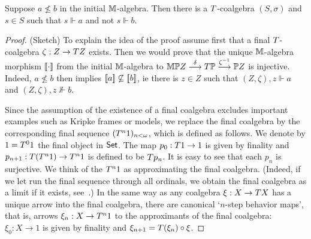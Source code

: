 \documentclass{book}
\begin{document}
\begin{proposition}\label{prop:coalg-compl}
  Suppose $a\not\le b$ in the initial $\mathbb{M}$-algebra. Then there is
  a $T$-coalgebra $(S,\sigma)$ and $s\in S$ such that $s\Vdash a$
  and not $s\Vdash b$. 
\end{proposition}
\xxviproofspace
\begin{proof} (Sketch) \hspace{0.1cm} To explain the idea of the proof
  assume first that a final $T$-coalgebra $\zeta:Z\to T Z$ exists.
  Then we would prove that the unique $\mathbb{M}$-algebra morphism
  $\mathopen{[\![} \cdot \mathclose{]\!]}$ from the initial $\mathbb{M}$-algebra to $\mathbb{M}\mathbb{P} Z
  \stackrel{\delta}{\longrightarrow}
  T\mathbb{P}\stackrel{\zeta^{-1}}{\longrightarrow}\mathbb{P} Z$ is injective.
  Indeed, $a\not\le b$ then implies $\mathopen{[\![} a \mathclose{]\!]}\not\subseteq\mathopen{[\![} b \mathclose{]\!]}$, ie
  there is $z\in Z$ such that $(Z,\zeta),z\Vdash a$ and
  $(Z,\zeta),z\not\Vdash b$.

  Since the assumption of the existence of a final coalgebra excludes
  important examples such as Kripke frames or models, we replace the
  final coalgebra by the corresponding final sequence
  $(T^n1)_{n<\omega}$, which is defined as follows.  We denote by
  $1=T^01$ the final object in $\mathsf{Set}$.  The map $p_0:T{1}\to{1}$ is
  given by finality and $p_{n+1}:T(T^n{1})\to T^n{1}$ is defined to
  be $T p_n$.  It is easy to see that each $p_{n}$ is surjective.  We
  think of the $T^n{1}$ as approximating the final coalgebra.
  (Indeed, if we let run the final sequence through all ordinals, we
  obtain the final coalgebra as a limit if it exists, 
  see~\cite{adam-koub:gfp}.)  In the same way as any coalgebra
  $\xi:X\to T X$ has a unique arrow into the final coalgebra, there
  are canonical `$n$-step behavior maps', that is, arrows $\xi_n:X\to
  T^n{1}$ to the approximants of the final coalgebra: $\xi_0:X\to 1$
  is given by finality and $\xi_{n+1}=T(\xi_n)\circ\xi$.


\end{proof}
\end{document}
